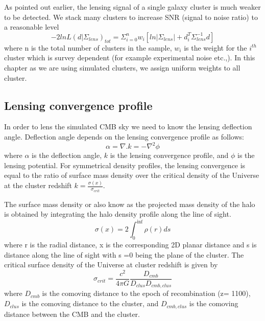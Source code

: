   As pointed out earlier, the lensing signal of a single galaxy cluster is much weaker to be detected. 
  We stack many clusters to increase SNR (signal to noise ratio) to a reasonable level
  \begin{equation}
  -2ln L(d| \Sigma_{lens})_{tot} = \Sigma^{n}_{i =0} w_{i} [ln |\Sigma_{lens}| + d^{T}_{i} \Sigma^{-1}_{lens}  d]
  \end{equation}
  where n is the total number of clusters in the sample, $w_{i}$ is the weight for the $i^{th}$ cluster which is survey dependent (for example experimental noise etc.,).
  In this chapter as we are using simulated clusters, we assign uniform weights to all cluster.  

  \subsection{Lensing convergence profile}
  In order to lens the simulated CMB sky we need to know the lensing deflection angle.
  Deflection angle depends on the lensing convergence profile as follows:
\begin{equation}
 \alpha = \nabla. k = -\nabla^{2} \phi
 \end{equation}
 where $\alpha$ is the deflection angle, $k$ is the lensing convergence profile, and $\phi$ is the lensing potential.
 For symmetrical density profiles, the lensing convergence is equal to the ratio of surface mass density over the critical density of the Universe at the cluster redshift $k = \frac{\sigma(x)}{\sigma_{crit}}$.
 
The surface mass density or also know as the projected mass density of the halo is obtained by integrating the halo density profile along the line of sight. 
 \begin{equation}
 \sigma(x) = 2 \int^{\inf}_{0} \rho(r) ds
 \label{eq:surface_density}
 \end{equation}
 where r is the radial distance, x is the corresponding 2D planar distance and s is distance along the line of sight with s =0 being the plane of the cluster.
 The critical surface density of the Universe at cluster redshift is given by
 \begin{equation}
 \sigma_{crit} = \frac{c^{2}}{4\pi G} \frac{D_{cmb}}{D_{clus}D_{cmb,clus}}
 \end{equation}
 where $D_{cmb}$ is the comoving distance to the epoch of recombination (z= 1100), $D_{clus}$ is the comoving distance to the cluster, and $D_{cmb,clus}$ is the comoving distance between the CMB and the cluster.
 

